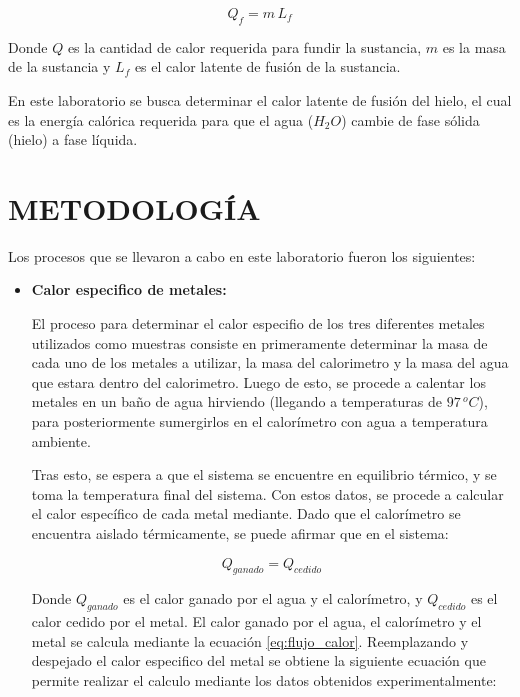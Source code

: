 \documentclass[10pt]{article}
\begin{document}
\begin{multicols*}{2}
        \begin{equation}
            Q_f = m \, L_f
            \label{eq:calor_latente}
        \end{equation}

        Donde $Q$ es la cantidad de calor requerida para fundir la sustancia, $m$ es la masa de la sustancia y $L_f$ es el calor latente de fusión de la sustancia.

        En este laboratorio se busca determinar el calor latente de fusión del hielo, el cual es la energía calórica requerida para que el agua ($H_2O$) cambie de fase sólida (hielo) a fase líquida.


    \section{\small METODOLOGÍA}
    Los procesos que se llevaron a cabo en este laboratorio fueron los siguientes:

    \begin{itemize}
        \item \textbf{Calor especifico de metales:}
        
            El proceso para determinar el calor especifio de los tres diferentes metales utilizados como muestras consiste en primeramente determinar la masa de cada uno de los metales a utilizar, la masa del calorimetro y la masa del agua que estara dentro del calorimetro. Luego de esto, se procede a calentar los metales en un baño de agua hirviendo (llegando a temperaturas de $97 \, ^oC$), para posteriormente sumergirlos en el calorímetro con agua a temperatura ambiente.
            
            Tras esto, se espera a que el sistema se encuentre en equilibrio térmico, y se toma la temperatura final del sistema. Con estos datos, se procede a calcular el calor específico de cada metal mediante. Dado que el calorímetro se encuentra aislado térmicamente, se puede afirmar que en el sistema:

            \begin{equation}
                Q_{ganado} = Q_{cedido}
                \label{eq:relacion_calor}
            \end{equation}

            Donde $Q_{ganado}$ es el calor ganado por el agua y el calorímetro, y $Q_{cedido}$ es el calor cedido por el metal. El calor ganado por el agua, el calorímetro y el metal se calcula mediante la ecuación \ref{eq:flujo_calor}. Reemplazando y despejado el calor especifico del metal se obtiene la siguiente ecuación que permite realizar el calculo mediante los datos obtenidos experimentalmente:


\end{itemize}
\end{multicols*}
\end{document}
